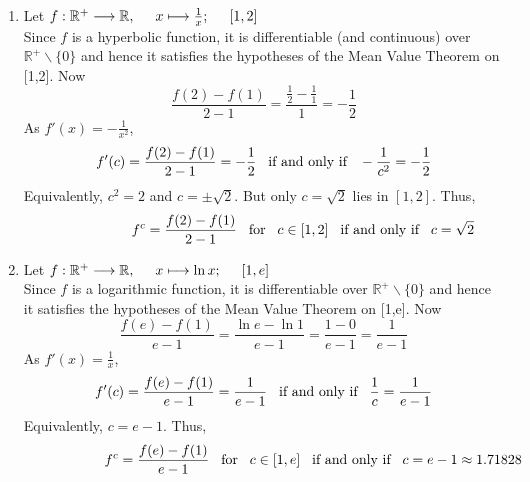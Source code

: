 \documentclass[12pt]{amsart}
\begin{document}
\begin{enumerate}
\begin{enumerate}
			\item Let $f: \mathbb{R}^+\longrightarrow\mathbb{R},\hspace{0.5cm} x\longmapsto \frac{1}{x}; 
			\hspace{0.5cm} [1,2]$ \\
			Since $f$ is a hyperbolic function, it is differentiable (and continuous) over $\mathbb{R}^+ 				\backslash \{0\}$ and hence it satisfies the hypotheses of the Mean Value Theorem on [1,2]. 				Now
			$$\frac{f(2)-f(1)}{2-1} = \frac{\frac{1}{2}-\frac{1}{1}}{1} = -\frac{1}{2}$$
			As $f'(x)=-\frac{1}{x^2}$,
			$$f'(c)=\frac{f(2)-f(1)}{2-1}=-\frac{1}{2} \hspace{0.3cm} \text{if and only if} \hspace{0.3cm} 					-\frac{1}{c^2}=-\frac{1}{2}$$
			Equivalently, $c^2=2$ and $c=\pm \sqrt{2}$. But only $c=\sqrt{2}$ lies in $[1,2]$. Thus,
			$$\hspace{2cm} f^c=\frac{f(2)-f(1)}{2-1} \hspace{0.3cm} \text{for} \hspace{0.3cm} c \in [1,2] 				\hspace{0.3cm} \text{if and only if} \hspace{0.3cm} c = \sqrt{2}$$
			
			\item Let $f: \mathbb{R}^+\longrightarrow\mathbb{R},\hspace{0.5cm} x\longmapsto \ln x; 
			\hspace{0.5cm} [1,e]$ \\
			Since $f$ is a logarithmic function, it is differentiable over $\mathbb{R}^+ \backslash \{0\}$ and
			hence it satisfies the hypotheses of the Mean Value Theorem on [1,e]. Now
			$$\frac{f(e)-f(1)}{e-1} = \frac{\ln e-\ln 1}{e-1} = \frac{1-0}{e-1} = \frac{1}{e-1}$$
			As $f'(x)=\frac{1}{x}$,
			$$f'(c)=\frac{f(e)-f(1)}{e-1}=\frac{1}{e-1} \hspace{0.3cm} \text{if and only if} \hspace{0.3cm} 				\frac{1}{c}=\frac{1}{e-1}$$
			Equivalently, $c=e-1$. Thus,
			$$\hspace{2cm} f^c=\frac{f(e)-f(1)}{e-1} \hspace{0.3cm} \text{for} \hspace{0.3cm} c \in [1,e] 				\hspace{0.3cm} \text{if and only if} \hspace{0.3cm} c = e-1 \approx 1.71828$$

		\end{enumerate}
	

\end{enumerate}
\end{document}
